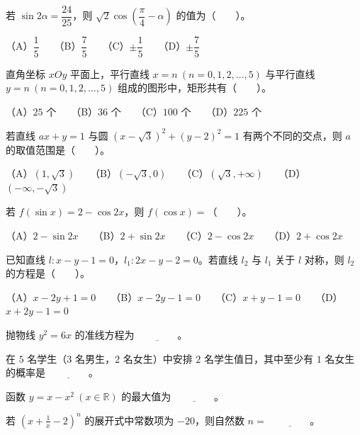 \begin{question}
若 $\sin 2\alpha=\dfrac{24}{25}$，则 $\sqrt{2}\cos\left(\dfrac{\pi}{4}-\alpha\right)$ 的值为\mbox{（　　）}。

（A）$\dfrac{1}{5}$　　（B）$\dfrac{7}{5}$　　（C）$\pm\dfrac{1}{5}$　　（D）$\pm\dfrac{7}{5}$

\end{question}
\begin{question}
直角坐标 $xOy$ 平面上，平行直线 $x=n\ (n=0,1,2,\ldots,5)$ 与平行直线 $y=n\ (n=0,1,2,\ldots,5)$ 组成的图形中，矩形共有\mbox{（　　）}。

（A）$25$ 个　　（B）$36$ 个　　（C）$100$ 个　　（D）$225$ 个

\end{question}
\begin{question}
若直线 $ax+y=1$ 与圆 $(x-\sqrt{3})^2+(y-2)^2=1$ 有两个不同的交点，则 $a$ 的取值范围是\mbox{（　　）}。

（A）$(1,\sqrt{3})$　　（B）$(-\sqrt{3},0)$　　（C）$(\sqrt{3},+\infty)$　　（D）$(-\infty,-\sqrt{3})$

\end{question}
\begin{question}
若 $f(\sin x)=2-\cos 2x$，则 $f(\cos x)=$\mbox{（　　）}。

（A）$2-\sin 2x$　　（B）$2+\sin 2x$　　（C）$2-\cos 2x$　　（D）$2+\cos 2x$

\end{question}
\begin{question}
已知直线 $l:x-y-1=0$，$l_1:2x-y-2=0$。若直线 $l_2$ 与 $l_1$ 关于 $l$ 对称，则 $l_2$ 的方程是\mbox{（　　）}。

（A）$x-2y+1=0$　　（B）$x-2y-1=0$　　（C）$x+y-1=0$　　（D）$x+2y-1=0$

\end{question}

\begin{question}
抛物线 $y^2=6x$ 的准线方程为 $\underline{\qquad\qquad}$。

\end{question}
\begin{question}
在 $5$ 名学生（$3$ 名男生，$2$ 名女生）中安排 $2$ 名学生值日，其中至少有 $1$ 名女生的概率是 $\underline{\qquad\qquad}$。

\end{question}
\begin{question}
函数 $y=x-x^2\ (x\in\mathbb{R})$ 的最大值为 $\underline{\qquad\qquad}$。

\end{question}
\begin{question}
若 $\left(x+\frac{1}{x}-2\right)^n$ 的展开式中常数项为 $-20$，则自然数 $n=$ $\underline{\qquad\qquad}$。

\end{question}

